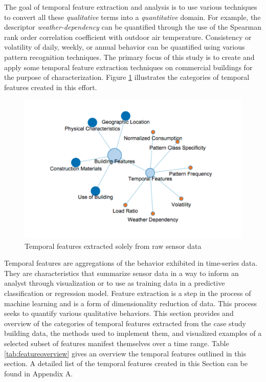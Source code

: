 The goal of temporal feature extraction and analysis is to use various techniques to convert all these \emph{qualitative} terms into a \emph{quantitative} domain. For example, the descriptor \emph{weather-dependency} can be quantified through the use of the Spearman rank order correlation coefficient with outdoor air temperature. Consistency or volatility of daily, weekly, or annual behavior can be quantified using various pattern recognition techniques. The primary focus of this study is to create and apply some temporal feature extraction techniques on commercial buildings for the purpose of characterization. Figure \ref{fig:temporalfeatures} illustrates the categories of temporal features created in this effort.

\begin{figure}[ht!]
\begin{center}
\includegraphics[width=0.7\columnwidth]{figures/TemporalFeatures/TemporalFeatures}
\caption{Temporal features extracted solely from raw sensor data
\label{fig:temporalfeatures}%
}
\end{center}
\end{figure}

Temporal features are aggregations of the behavior exhibited in time-series data. They are characteristics that summarize sensor data in a way to inform an analyst through visualization or to use as training data in a predictive classification or regression model. Feature extraction is a step in the process of machine learning and is a form of dimensionality reduction of data. This process seeks to quantify various qualitative behaviors. This section provides and overview of the categories of temporal features extracted from the case study building data, the methods used to implement them, and visualized examples of a selected subset of features manifest themselves over a time range. Table \ref{tab:featureoverview} gives an overview the temporal features outlined in this section.  A detailed list of the temporal features created in this Section can be found in Appendix A. 

